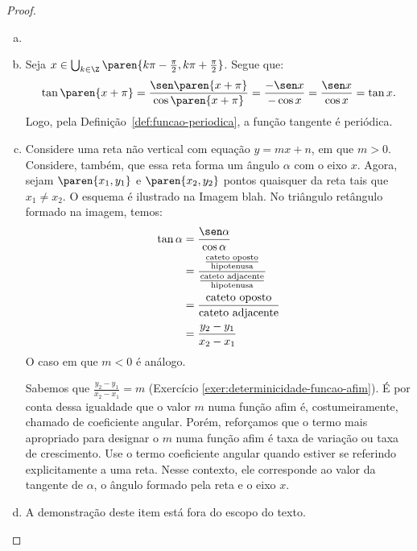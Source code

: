 \begin{proof}
  \begin{enumerate}[(a)]
    \item[]
    \item Seja $x \in \bigcup_{k \in \Z} \paren{k \pi - \frac{\pi} 2, k \pi + \frac {\pi} 2}$. 
  Segue que: $$\tan \paren{x+\pi} = \frac{\sen \paren{x+\pi}}{\cos \paren{x+\pi}}= \frac{-\sen x}{-\cos x}= \frac{\sen x}{\cos x}= \tan x.$$
  Logo, pela Definição~\ref{def:funcao-periodica}, a função tangente é periódica.
  \item Considere uma reta não vertical com equação $y=mx+n$, em que $m > 0$. Considere, também, que essa reta forma um ângulo $\alpha$ com o eixo $x$. Agora, sejam $\paren {x_1, y_1}$ e $\paren{x_2, y_2}$ pontos quaisquer da reta tais que $x_1 \neq x_2$. 
  O esquema é ilustrado na Imagem blah. %
  No triângulo retângulo formado na imagem, temos:
  \begin{align*}
    \tan \alpha &= \frac {\sen\alpha}{\cos\alpha} \\ 
    &= \frac{ \frac{\text{cateto oposto}}{\text{hipotenusa}}   }{\frac{\text{cateto adjacente}}{\text{hipotenusa}}} \\
    &= \frac{\text{cateto oposto}}{\text{cateto adjacente}}\\
    &= \frac{y_2 - y_1}{x_2 - x_1}
  \end{align*}
  O caso em que $m < 0$ é análogo.

  Sabemos que $\frac{y_2 - y_1}{x_2 - x_1} = m$ (Exercício \ref{exer:determinicidade-funcao-afim}).
  É por conta dessa igualdade que o valor $m$ numa função afim é, costumeiramente, chamado de coeficiente angular. Porém, reforçamos que o termo mais apropriado para designar o $m$ numa função afim é taxa de variação ou taxa de crescimento. Use o termo coeficiente angular quando estiver se referindo explicitamente a uma reta. Nesse contexto, ele corresponde ao valor da tangente de $\alpha$, o ângulo formado pela reta e o eixo $x$.
  \item A demonstração deste item está fora do escopo do texto.
  \end{enumerate}

  
\end{proof}